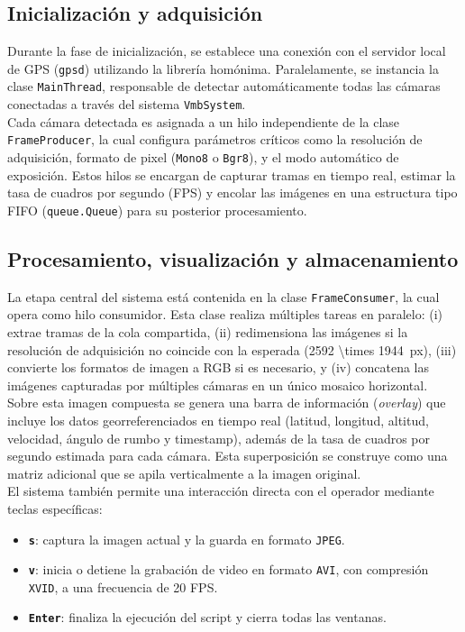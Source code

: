   \subsection{Inicialización y adquisición}
  
  Durante la fase de inicialización, se establece una conexión con el servidor local de GPS (\texttt{gpsd}) utilizando la librería homónima. Paralelamente, se instancia la clase \texttt{MainThread}, responsable de detectar automáticamente todas las cámaras conectadas a través del sistema \texttt{VmbSystem}.\\
  
   Cada cámara detectada es asignada a un hilo independiente de la clase \texttt{FrameProducer}, la cual configura parámetros críticos como la resolución de adquisición, formato de pixel (\texttt{Mono8} o \texttt{Bgr8}), y el modo automático de exposición. Estos hilos se encargan de capturar tramas en tiempo real, estimar la tasa de cuadros por segundo (FPS) y encolar las imágenes en una estructura tipo FIFO (\texttt{queue.Queue}) para su posterior procesamiento.
  
  \subsection{Procesamiento, visualización y almacenamiento}
  
  La etapa central del sistema está contenida en la clase \texttt{FrameConsumer}, la cual opera como hilo consumidor. Esta clase realiza múltiples tareas en paralelo: (i) extrae tramas de la cola compartida, (ii) redimensiona las imágenes si la resolución de adquisición no coincide con la esperada (\SI[parse-numbers = false]{2592 \times 1944}{px}), (iii) convierte los formatos de imagen a RGB si es necesario, y (iv) concatena las imágenes capturadas por múltiples cámaras en un único mosaico horizontal.\\
  
  Sobre esta imagen compuesta se genera una barra de información (\textit{overlay}) que incluye los datos georreferenciados en tiempo real (latitud, longitud, altitud, velocidad, ángulo de rumbo y timestamp), además de la tasa de cuadros por segundo estimada para cada cámara. Esta superposición se construye como una matriz adicional que se apila verticalmente a la imagen original.\\
  
  El sistema también permite una interacción directa con el operador mediante teclas específicas:
  \begin{itemize}
      \item \textbf{\texttt{s}}: captura la imagen actual y la guarda en formato \texttt{JPEG}.
      \item \textbf{\texttt{v}}: inicia o detiene la grabación de video en formato \texttt{AVI}, con compresión \texttt{XVID}, a una frecuencia de 20 FPS.
      \item \textbf{\texttt{Enter}}: finaliza la ejecución del script y cierra todas las ventanas.
  \end{itemize}
  
